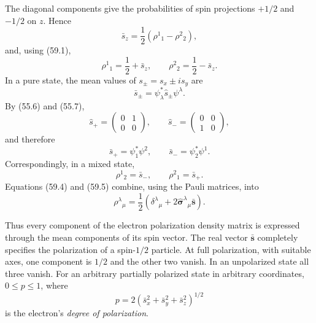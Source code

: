 The diagonal components give the probabilities of spin projections $+1/2$
and $-1/2$ on $z$. Hence
\[
 \bar s_z=\frac12(\rho^1{}_1-\rho^2{}_2),
\]
and, using (59.1),
\begin{equation}
 \rho^1{}_1=\frac12+\bar s_z,\qquad
 \rho^2{}_2=\frac12-\bar s_z.
 \tag{59.4}
\end{equation}
In a pure state, the mean values of $s_\pm=s_x\pm is_y$ are
\[
 \bar s_\pm=\psi_\lambda^*\hat s_\pm\psi^\lambda.
\]
By (55.6) and (55.7),
\[
 \hat s_+=\begin{pmatrix}0&1\\0&0\end{pmatrix},\qquad
 \hat s_-=\begin{pmatrix}0&0\\1&0\end{pmatrix},
\]
and therefore
\[
 \bar s_+=\psi_1^*\psi^2,\qquad \bar s_-=\psi_2^*\psi^1.
\]
Correspondingly, in a mixed state,
\begin{equation}
 \rho^1{}_2=\bar s_-,\qquad \rho^2{}_1=\bar s_+.
 \tag{59.5}
\end{equation}
Equations (59.4) and (59.5) combine, using the Pauli matrices, into
\begin{equation}
 \rho^\lambda{}_{\mu}=\frac12
 (\delta^\lambda{}_{\mu}+2\hat{\boldsymbol\sigma}^\lambda{}_{\mu}
 \bar{\mathbf s}).
 \tag{59.6}
\end{equation}

Thus every component of the electron polarization density matrix is expressed
through the mean components of its spin vector. The real vector
$\bar{\mathbf s}$ completely specifies the polarization of a spin-$1/2$
particle. At full polarization, with suitable axes, one component is $1/2$
and the other two vanish. In an unpolarized state all three vanish. For an
arbitrary partially polarized state in arbitrary coordinates,
$0\leqslant p\leqslant1$, where
\[
 p=2(\bar s_x^2+\bar s_y^2+\bar s_z^2)^{1/2}
\]
is the electron's \emph{degree of polarization}.

